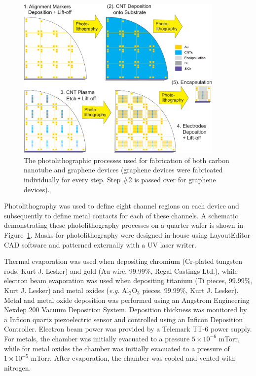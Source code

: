 \documentclass[
  letterpaper,
  DIV=11,
  numbers=noendperiod]{scrartcl}
\begin{document}
\begin{figure}

{\centering \includegraphics[width=0.9\textwidth,height=\textheight]{figures/ch4/photolithography-cycle.png}

}

\caption{\label{fig-qw-photolithography}The photolithographic processes
used for fabrication of both carbon nanotube and graphene devices
(graphene devices were fabricated individually for every step. Step \#2
is passed over for graphene devices).}

\end{figure}

Photolithography was used to define eight channel regions on each device
and subsequently to define metal contacts for each of these channels. A
schematic demonstrating these photolithography processes on a quarter
wafer is shown in Figure~\ref{fig-qw-photolithography}. Masks for
photolithography were designed in-house using LayoutEditor CAD software
and patterned externally with a UV laser writer.

Thermal evaporation was used when depositing chromium (Cr-plated
tungsten rods, Kurt J. Lesker) and gold (Au wire, 99.99\%, Regal
Castings Ltd.), while electron beam evaporation was used when depositing
titanium (Ti pieces, 99.99\%, Kurt J. Lesker) and metal oxides
(\emph{e.g.} Al\(_2\)O\(_3\) pieces, 99.99\%, Kurt J. Lesker). Metal and
metal oxide deposition was performed using an Angstrom Engineering
Nexdep 200 Vacuum Deposition System. Deposition thickness was monitored
by a Inficon quartz piezoelectric sensor and controlled using an Inficon
Deposition Controller. Electron beam power was provided by a Telemark
TT-6 power supply. For metals, the chamber was initially evacuated to a
pressure \(5 \times 10^{-6}\) mTorr, while for metal oxides the chamber
was initially evacuated to a pressure of \(1 \times 10^{-5}\) mTorr.
After evaporation, the chamber was cooled and vented with nitrogen.
\end{document}
